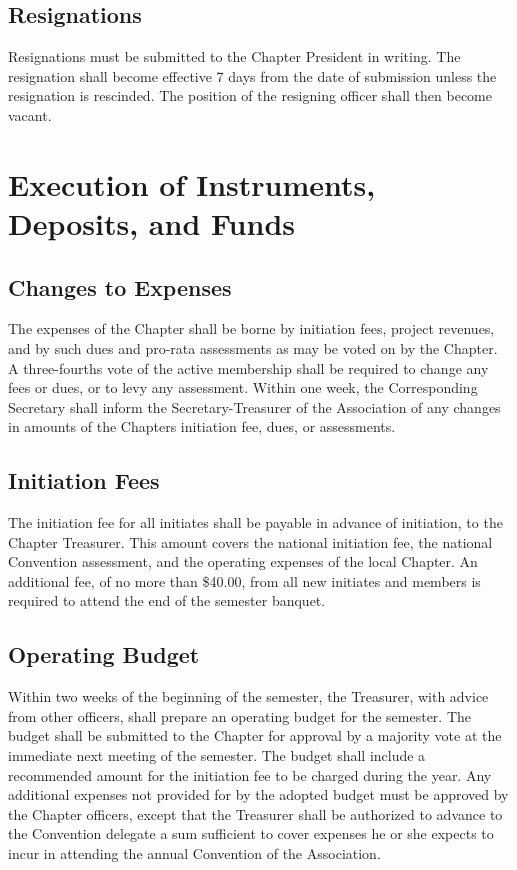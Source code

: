 \documentclass{article}
\begin{document}
	\subsection{Resignations}
	Resignations must be submitted to the Chapter President in writing. The resignation shall become effective 7 days from the date of submission unless the resignation is rescinded. The position of the resigning officer shall then become vacant.
	
	\section{Execution of Instruments, Deposits, and Funds}
	\subsection{Changes to Expenses}
	The expenses of the Chapter shall be borne by initiation fees, project revenues, and by such dues and pro-rata assessments as may be voted on by the Chapter. A three-fourths vote of the active membership shall be required to change any fees or dues, or to levy any assessment. Within one week, the Corresponding Secretary shall inform the Secretary-Treasurer of the Association of any changes in amounts of the Chapter\textquotesingle s initiation fee, dues, or assessments.
	\subsection{Initiation Fees}
	The initiation fee for all initiates shall be payable in advance of initiation, to the Chapter Treasurer. This amount covers the national initiation fee, the national Convention assessment, and the operating expenses of the local Chapter. An additional fee, of no more than \$40.00, from all new initiates and members is required to attend the end of the semester banquet.
	\subsection{Operating Budget}
	Within two weeks of the beginning of the semester, the Treasurer, with advice from other officers, shall prepare an operating budget for the semester. The budget shall be submitted to the Chapter for approval by a majority vote at the immediate next meeting of the semester. The budget shall include a recommended amount for the initiation fee to be charged during the year. Any additional expenses not provided for by the adopted budget must be approved by the Chapter officers, except that the Treasurer shall be authorized to advance to the Convention delegate a sum sufficient to cover expenses he or she expects to incur in attending the annual Convention of the Association.
\end{document}
